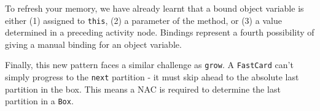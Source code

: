 To refresh your memory, we have already learnt that a bound object variable is either (1) assigned to \texttt{this}, (2) a parameter of the method, or (3) a
value determined in a preceding activity node. Bindings represent a fourth possibility of giving a manual binding for an object variable.

Finally, this new pattern faces a similar challenge as \texttt{grow}. A \texttt{FastCard} can't simply progress to the \texttt{next} partition - it
must skip ahead to the absolute last partition in the box. This means a NAC is required to determine the last partition in a \texttt{Box}.

  



